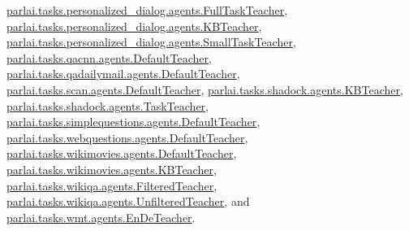 \hyperlink{classparlai_1_1tasks_1_1personalized__dialog_1_1agents_1_1FullTaskTeacher}{parlai.\+tasks.\+personalized\+\_\+dialog.\+agents.\+Full\+Task\+Teacher}, \hyperlink{classparlai_1_1tasks_1_1personalized__dialog_1_1agents_1_1KBTeacher}{parlai.\+tasks.\+personalized\+\_\+dialog.\+agents.\+K\+B\+Teacher}, \hyperlink{classparlai_1_1tasks_1_1personalized__dialog_1_1agents_1_1SmallTaskTeacher}{parlai.\+tasks.\+personalized\+\_\+dialog.\+agents.\+Small\+Task\+Teacher}, \hyperlink{classparlai_1_1tasks_1_1qacnn_1_1agents_1_1DefaultTeacher}{parlai.\+tasks.\+qacnn.\+agents.\+Default\+Teacher}, \hyperlink{classparlai_1_1tasks_1_1qadailymail_1_1agents_1_1DefaultTeacher}{parlai.\+tasks.\+qadailymail.\+agents.\+Default\+Teacher}, \hyperlink{classparlai_1_1tasks_1_1scan_1_1agents_1_1DefaultTeacher}{parlai.\+tasks.\+scan.\+agents.\+Default\+Teacher}, \hyperlink{classparlai_1_1tasks_1_1shadock_1_1agents_1_1KBTeacher}{parlai.\+tasks.\+shadock.\+agents.\+K\+B\+Teacher}, \hyperlink{classparlai_1_1tasks_1_1shadock_1_1agents_1_1TaskTeacher}{parlai.\+tasks.\+shadock.\+agents.\+Task\+Teacher}, \hyperlink{classparlai_1_1tasks_1_1simplequestions_1_1agents_1_1DefaultTeacher}{parlai.\+tasks.\+simplequestions.\+agents.\+Default\+Teacher}, \hyperlink{classparlai_1_1tasks_1_1webquestions_1_1agents_1_1DefaultTeacher}{parlai.\+tasks.\+webquestions.\+agents.\+Default\+Teacher}, \hyperlink{classparlai_1_1tasks_1_1wikimovies_1_1agents_1_1DefaultTeacher}{parlai.\+tasks.\+wikimovies.\+agents.\+Default\+Teacher}, \hyperlink{classparlai_1_1tasks_1_1wikimovies_1_1agents_1_1KBTeacher}{parlai.\+tasks.\+wikimovies.\+agents.\+K\+B\+Teacher}, \hyperlink{classparlai_1_1tasks_1_1wikiqa_1_1agents_1_1FilteredTeacher}{parlai.\+tasks.\+wikiqa.\+agents.\+Filtered\+Teacher}, \hyperlink{classparlai_1_1tasks_1_1wikiqa_1_1agents_1_1UnfilteredTeacher}{parlai.\+tasks.\+wikiqa.\+agents.\+Unfiltered\+Teacher}, and \hyperlink{classparlai_1_1tasks_1_1wmt_1_1agents_1_1EnDeTeacher}{parlai.\+tasks.\+wmt.\+agents.\+En\+De\+Teacher}.



